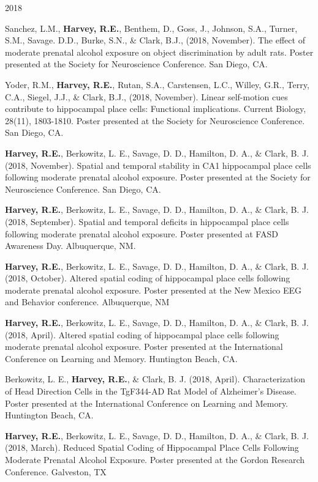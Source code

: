 \begin{cventries}
\cventry
    {} %
    {} %
    {} %
    {2018} %
    {
      \begin{cvitems} %
      \setlength\itemsep{0.35em}
        \item {Sanchez, L.M., \textbf{Harvey, R.E.}, Benthem, D., Goss, J., Johnson, S.A., Turner, S.M., Savage. D.D., Burke, S.N., \& Clark, B.J., (2018, November). The effect of moderate prenatal alcohol exposure on object discrimination by adult rats. Poster presented at the Society for Neuroscience Conference. San Diego, CA.}
        \item {Yoder, R.M., \textbf{Harvey, R.E.}, Rutan, S.A., Carstensen, L.C., Willey, G.R., Terry, C.A., Siegel, J.J., \& Clark, B.J., (2018, November). Linear self-motion cues contribute to hippocampal place cells: Functional implications. Current Biology, 28(11), 1803-1810. Poster presented at the Society for Neuroscience Conference. San Diego, CA.}
        \item {\textbf{Harvey, R.E.}, Berkowitz, L. E., Savage, D. D., Hamilton, D. A., \& Clark, B. J. (2018, November). Spatial and temporal stability in CA1 hippocampal place cells following moderate prenatal alcohol exposure. Poster presented at the Society for Neuroscience Conference. San Diego, CA.}
        \item {\textbf{Harvey, R.E.}, Berkowitz, L. E., Savage, D. D., Hamilton, D. A., \& Clark, B. J. (2018, September). Spatial and temporal deficits in hippocampal place cells following moderate prenatal alcohol exposure. Poster presented at FASD Awareness Day. Albuquerque, NM.}
        \item {\textbf{Harvey, R.E.}, Berkowitz, L. E., Savage, D. D., Hamilton, D. A., \& Clark, B. J. (2018, October). Altered spatial coding of hippocampal place cells following moderate prenatal alcohol exposure. Poster presented at the New Mexico EEG and Behavior conference. Albuquerque, NM}
        \item {\textbf{Harvey, R.E.}, Berkowitz, L. E., Savage, D. D., Hamilton, D. A., \& Clark, B. J. (2018, April). Altered spatial coding of hippocampal place cells following moderate prenatal alcohol exposure. Poster presented at the International Conference on Learning and Memory. Huntington Beach, CA.}
        \item {Berkowitz, L. E., \textbf{Harvey, R.E.}, \& Clark, B. J. (2018, April). Characterization of Head Direction Cells in the TgF344-AD Rat Model of Alzheimer’s Disease. Poster presented at the International Conference on Learning and Memory. Huntington Beach, CA.}
        \item {\textbf{Harvey, R.E.}, Berkowitz, L. E., Savage, D. D., Hamilton, D. A., \& Clark, B. J. (2018, March). Reduced Spatial Coding of Hippocampal Place Cells Following Moderate Prenatal Alcohol Exposure. Poster presented at the Gordon Research Conference. Galveston, TX}
      \end{cvitems}
    }
\end{cventries}

